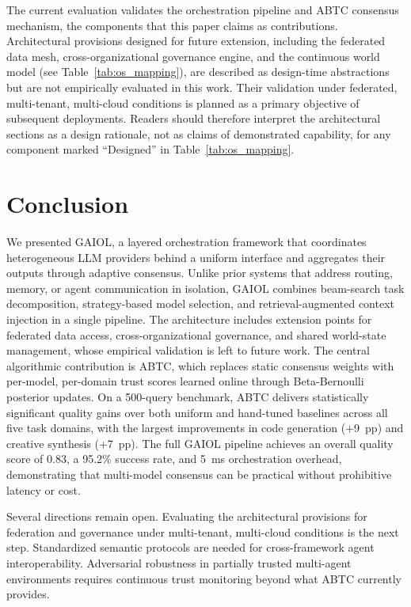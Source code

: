 \documentclass{iopjournal}
\begin{document}
The current evaluation validates the orchestration pipeline and ABTC consensus mechanism, the components that this paper claims as contributions. Architectural provisions designed for future extension, including the federated data mesh, cross-organizational governance engine, and the continuous world model (see Table~\ref{tab:os_mapping}), are described as design-time abstractions but are not empirically evaluated in this work. Their validation under federated, multi-tenant, multi-cloud conditions is planned as a primary objective of subsequent deployments. Readers should therefore interpret the architectural sections as a design rationale, not as claims of demonstrated capability, for any component marked ``Designed'' in Table~\ref{tab:os_mapping}.

\section{Conclusion}
\label{sec:conclusion}

We presented GAIOL, a layered orchestration framework that coordinates heterogeneous LLM providers behind a uniform interface and aggregates their outputs through adaptive consensus. Unlike prior systems that address routing, memory, or agent communication in isolation, GAIOL combines beam-search task decomposition, strategy-based model selection, and retrieval-augmented context injection in a single pipeline. The architecture includes extension points for federated data access, cross-organizational governance, and shared world-state management, whose empirical validation is left to future work. The central algorithmic contribution is ABTC, which replaces static consensus weights with per-model, per-domain trust scores learned online through Beta-Bernoulli posterior updates. On a 500-query benchmark, ABTC delivers statistically significant quality gains over both uniform and hand-tuned baselines across all five task domains, with the largest improvements in code generation (+9~pp) and creative synthesis (+7~pp). The full GAIOL pipeline achieves an overall quality score of 0.83, a 95.2\% success rate, and 5~ms orchestration overhead, demonstrating that multi-model consensus can be practical without prohibitive latency or cost.

Several directions remain open. Evaluating the architectural provisions for federation and governance under multi-tenant, multi-cloud conditions is the next step. Standardized semantic protocols are needed for cross-framework agent interoperability. Adversarial robustness in partially trusted multi-agent environments requires continuous trust monitoring beyond what ABTC currently provides.
\end{document}
